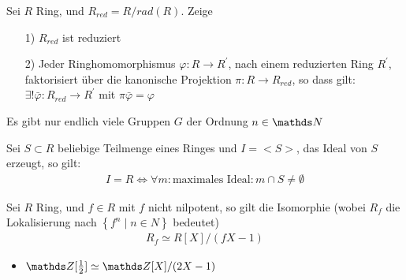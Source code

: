 \documentclass[ngerman, parskip=half, titlepage=false]{scrartcl}
\begin{document}
\begin{Satz}
  Sei $R$ Ring, und $R_{red} = R/rad(R)$. Zeige 
  \begin{itemize}
    \item[1)] $R_{red}$ ist reduziert
      
    \item[2)] Jeder Ringhomomorphismus $\varphi : R \rightarrow
      R^{'}$, nach einem reduzierten Ring $R^{'}$, faktorisiert
      über die kanonische Projektion $\pi : R \rightarrow R_{red}$, 
      so dass gilt: $\exists ! \bar{\varphi} : R_{red} \rightarrow R^{'}$
      mit $\pi \bar{\varphi} = \varphi$
  \end{itemize}
\end{Satz}

\begin{Lem}
  Es gibt nur endlich viele Gruppen $G$ der Ordnung $n \in \N$
\end{Lem}

\begin{Satz}
  Sei $S \subset R$ beliebige Teilmenge eines Ringes und $I=<S>$, das
  Ideal von $S$ erzeugt, so gilt:\\
  \begin{gather*}
    I=R \Leftrightarrow \forall m : \text{maximales Ideal} : m \cap S 
    \neq \emptyset
  \end{gather*}
 
\end{Satz}

\begin{Satz}                   
  Sei $R$ Ring, und $f \in R$ mit $f$ nicht nilpotent, so gilt  
  die Isomorphie (wobei $R_f$ die Lokalisierung nach $\left\{   
    f^n \; \Big| \; n \in N \right\}$ bedeutet)                 
  \begin{gather*}                                               
    R_f \simeq R[X]/(fX - 1)                                    
  \end{gather*}                                                 
\end{Satz}                                                      

\begin{Bsp}
  \begin{itemize}
    \item $\Z[\frac{1}{2}] \simeq \Z[X]/(2X-1)$
  \end{itemize}
\end{Bsp}
\end{document}
